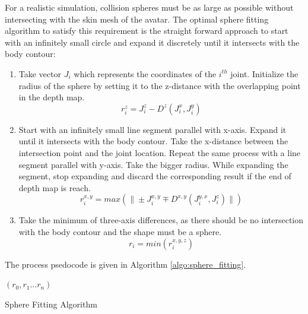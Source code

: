 \documentclass[twocolumn]{svjour3}          %
\begin{document}
For a realistic simulation, collision spheres must be as large as possible without intersecting with the skin mesh of the avatar. The optimal sphere fitting algorithm to satisfy this requirement is the straight forward approach to start with an infinitely small circle and expand it discretely until it intersects with the body contour: 
\begin{enumerate}
\item Take vector $J_i$ which represents the coordinates of the $i^{th}$
joint.
Initialize the radius of the sphere by setting it to the z-distance with the overlapping point in the depth map.
\begin{equation}
r_i^z=J_i^z-D^z(J_i^x,J_i^y)
\label{eqn:z_sphere_radius}
\end{equation}
\item Start with an infinitely small line segment parallel with x-axis. Expand it until it intersects with the body contour. Take the x-distance between the intersection point and the joint location. Repeat the same process with a line segment parallel with y-axis. Take the bigger radius. While expanding the segment, stop expanding and discard the corresponding result if the end of depth map is reach.
\begin{equation}
r_i^{x,y}=max(\| \pm J_i^{x,y} \mp D^{x,y}(J_i^{y,x},J_i^z)\|)
\label{eqn:x_y_sphere_radius}
\end{equation}
\item Take the minimum of three-axis differences, as there should be no intersection with the body contour and the shape must be a sphere.
\begin{equation}
r_i=min(r_i^{x,y,z})
\label{eqn:minimum_sphere-radius}
\end{equation}
\end{enumerate}

The process psedocode is given in Algorithm \ref{algo:sphere_fitting}.

\begin{algorithm}
\dontprintsemicolon %
\Return $(r_0,r_1 \ldots r_n)$ 
\caption{Sphere Fitting Algorithm}
\label{algo:sphere_fitting}
\end{algorithm}  
\end{document}
